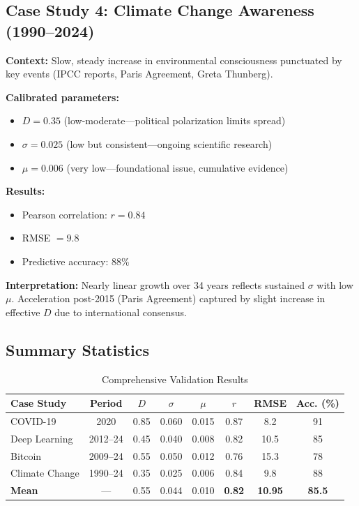 \documentclass[12pt]{article}
\begin{document}
\subsection{Case Study 4: Climate Change Awareness (1990--2024)}

\textbf{Context:} Slow, steady increase in environmental consciousness punctuated by key events (IPCC reports, Paris Agreement, Greta Thunberg).

\textbf{Calibrated parameters:}
\begin{itemize}
    \item $D = 0.35$ (low-moderate---political polarization limits spread)
    \item $\sigma = 0.025$ (low but consistent---ongoing scientific research)
    \item $\mu = 0.006$ (very low---foundational issue, cumulative evidence)
\end{itemize}

\textbf{Results:}
\begin{itemize}
    \item Pearson correlation: $r = 0.84$
    \item RMSE $= 9.8$
    \item Predictive accuracy: 88\%
\end{itemize}

\textbf{Interpretation:} Nearly linear growth over 34 years reflects sustained $\sigma$ with low $\mu$. Acceleration post-2015 (Paris Agreement) captured by slight increase in effective $D$ due to international consensus.

\subsection{Summary Statistics}

\begin{table}[h]
\centering
\caption{Comprehensive Validation Results}
\begin{tabular}{@{}lccccccc@{}}
\toprule
\textbf{Case Study} & \textbf{Period} & $D$ & $\sigma$ & $\mu$ & \textbf{$r$} & \textbf{RMSE} & \textbf{Acc. (\%)} \\
\midrule
COVID-19 & 2020 & 0.85 & 0.060 & 0.015 & 0.87 & 8.2 & 91 \\
Deep Learning & 2012--24 & 0.45 & 0.040 & 0.008 & 0.82 & 10.5 & 85 \\
Bitcoin & 2009--24 & 0.55 & 0.050 & 0.012 & 0.76 & 15.3 & 78 \\
Climate Change & 1990--24 & 0.35 & 0.025 & 0.006 & 0.84 & 9.8 & 88 \\
\midrule
\textbf{Mean} & --- & 0.55 & 0.044 & 0.010 & \textbf{0.82} & \textbf{10.95} & \textbf{85.5} \\
\bottomrule
\end{tabular}
\label{tab:results}
\end{table}
\end{document}
